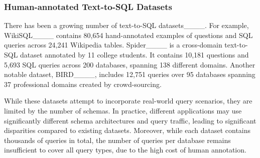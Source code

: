 

\subsubsection{Human-annotated Text-to-SQL Datasets}
There has been a growing number of text-to-SQL datasets____. 
For example, WikiSQL____ contains 80,654 hand-annotated examples of questions and SQL queries across 24,241 Wikipedia tables. Spider____ is a cross-domain text-to-SQL dataset annotated by 11 college students. It contains 10,181 questions and 5,693 SQL queries across 200 databases, spanning 138 different domains. Another notable dataset, BIRD____, includes 12,751 queries over 95 databases spanning 37 professional domains created by crowd-sourcing.

While these datasets attempt to incorporate real-world query scenarios, they are limited by the number of schemas. In practice, different applications may use significantly different schema architectures and query traffic, leading to significant disparities compared to existing datasets. Moreover, while each dataset contains thousands of queries in total, the number of queries per database remains insufficient to cover all query types, due to the high cost of human annotation.



